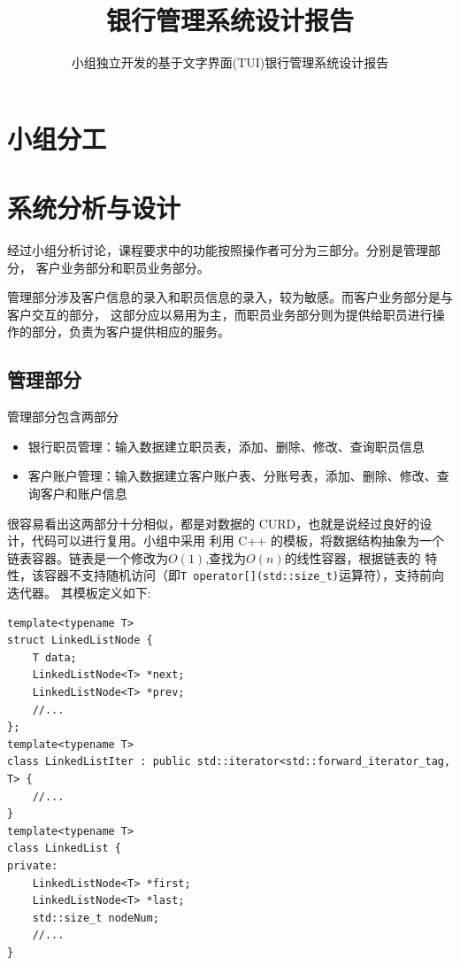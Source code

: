 \documentclass{ctexrep}
\begin{document}
\title{银行管理系统设计报告}
\author{\small 小组独立开发的基于文字界面(TUI)银行管理系统设计报告}
\date{}

\maketitle


\tableofcontents

\chapter{小组分工}


\chapter{系统分析与设计}
经过小组分析讨论，课程要求中的功能按照操作者可分为三部分。分别是管理部分，
客户业务部分和职员业务部分。

管理部分涉及客户信息的录入和职员信息的录入，较为敏感。而客户业务部分是与客户交互的部分，
这部分应以易用为主，而职员业务部分则为提供给职员进行操作的部分，负责为客户提供相应的服务。
\section{管理部分}
管理部分包含两部分
\begin{itemize}
  \item 银行职员管理：输入数据建立职员表，添加、删除、修改、查询职员信息
  \item 客户账户管理：输入数据建立客户账户表、分账号表，添加、删除、修改、查询客户和账户信息
\end{itemize}

很容易看出这两部分十分相似，都是对数据的 CURD，也就是说经过良好的设计，代码可以进行复用。小组中采用
利用 C++ 的模板，将数据结构抽象为一个链表容器。链表是一个修改为$O(1)$,查找为$O(n)$的线性容器，根据链表的
特性，该容器不支持随机访问（即\texttt{T operator[](std::size_t)}运算符），支持前向迭代器。
其模板定义如下:
\begin{verbatim}
template<typename T>
struct LinkedListNode {
    T data;
    LinkedListNode<T> *next;
    LinkedListNode<T> *prev;
    //...
};
template<typename T>
class LinkedListIter : public std::iterator<std::forward_iterator_tag, T> {
    //...
}
template<typename T>
class LinkedList {
private:
    LinkedListNode<T> *first;
    LinkedListNode<T> *last;
    std::size_t nodeNum;
    //...
}
\end{verbatim}
\end{document}
